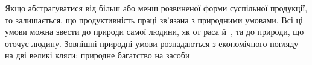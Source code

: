 Якщо абстрагуватися від більш або менш розвиненої форми
суспільної продукції, то залишається, що продуктивність праці
зв’язана з природними умовами. Всі ці умови можна звести до
природи самої людини, як от раса й~, та до природи, що оточує
людину. Зовнішні природні умови розпадаються з економічного
погляду на дві великі кляси: природне багатство на засоби
\parbreak{}  %
